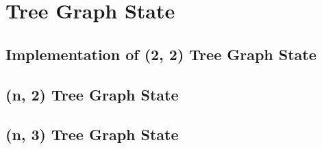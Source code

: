 \documentclass[12pt,a4paper]{report}
\begin{document}





\begingroup
    \hypersetup{linkcolor=black}
    \renewcommand\contentsname{\bfseries Contents}
    \tableofcontents
\endgroup









\chapter{Tree Graph State}
\label{chap:tree_graph_state}

\section{Implementation of (2, 2) Tree Graph State}

\section{(n, 2) Tree Graph State}

\section{(n, 3) Tree Graph State}


\printbibliography[heading=bibintoc]
\end{document}
